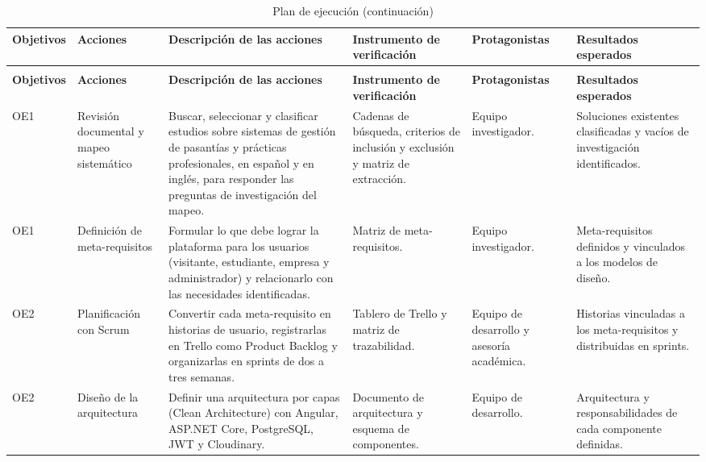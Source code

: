 \begin{landscape}
	\footnotesize
	\begin{longtable}{@{}>{\raggedright\arraybackslash}p{2cm}>{\raggedright\arraybackslash}p{2.9cm}>{\raggedright\arraybackslash}p{5.1cm}>{\raggedright\arraybackslash}p{3.8cm}>{\raggedright\arraybackslash}p{2.9cm}>{\raggedright\arraybackslash}p{3.8cm}@{}}
	\caption{Plan de ejecución}\label{tab:plan-ejecucion}\\
	\hline
	\rowcolor{gray!15}
	\textbf{Objetivos} & \textbf{Acciones} & \textbf{Descripción de las acciones} & \textbf{Instrumento de verificación} & \textbf{Protagonistas} & \textbf{Resultados esperados} \\
	\hline
	\endfirsthead
	\caption[]{Plan de ejecución (continuación)}\\
	\hline
	\rowcolor{gray!15}
	\textbf{Objetivos} & \textbf{Acciones} & \textbf{Descripción de las acciones} & \textbf{Instrumento de verificación} & \textbf{Protagonistas} & \textbf{Resultados esperados} \\
	\hline
	\endhead
	\hline
	\endlastfoot
	OE1 & Revisión documental y mapeo sistemático & Buscar, seleccionar y clasificar estudios sobre sistemas de gestión de pasantías y prácticas profesionales, en español y en inglés, para responder las preguntas de investigación del mapeo. & Cadenas de búsqueda, criterios de inclusión y exclusión y matriz de extracción. & Equipo investigador. & Soluciones existentes clasificadas y vacíos de investigación identificados. \\
	\hline
	OE1 & Definición de meta-requisitos & Formular lo que debe lograr la plataforma para los usuarios (visitante, estudiante, empresa y administrador) y relacionarlo con las necesidades identificadas. & Matriz de meta-requisitos. & Equipo investigador. & Meta-requisitos definidos y vinculados a los modelos de diseño. \\
	\hline
	OE2 & Planificación con Scrum & Convertir cada meta-requisito en historias de usuario, registrarlas en Trello como Product Backlog y organizarlas en sprints de dos a tres semanas. & Tablero de Trello y matriz de trazabilidad. & Equipo de desarrollo y asesoría académica. & Historias vinculadas a los meta-requisitos y distribuidas en sprints. \\
	\hline
	OE2 & Diseño de la arquitectura & Definir una arquitectura por capas (Clean Architecture) con Angular, ASP.NET Core, PostgreSQL, JWT y Cloudinary. & Documento de arquitectura y esquema de componentes. & Equipo de desarrollo. & Arquitectura y responsabilidades de cada componente definidas. \\

\end{longtable}
\end{landscape}
